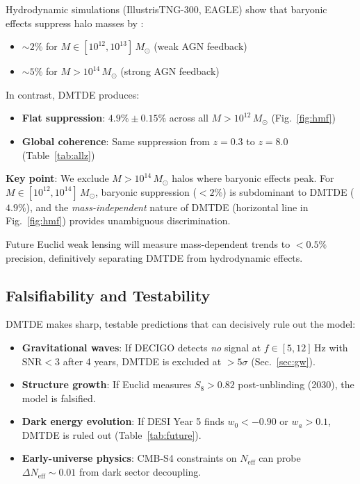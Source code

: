 \documentclass[aps,prd,twocolumn,superscriptaddress,nofootinbib,floatfix,preprintnumbers]{revtex4-2}
\newcommand{\DMTDE}{\textsc{DMTDE}\xspace}
\newcommand{\Msun}{\ensuremath{M_\odot}\xspace}
\begin{document}
Hydrodynamic simulations (IllustrisTNG-300, EAGLE) show that baryonic effects suppress halo masses by \citep{springel2018,pillepich2018}:
\begin{itemize}
    \item $\sim 2\%$ for $M \in [10^{12}, 10^{13}]\,\Msun$ (weak AGN feedback)
    \item $\sim 5\%$ for $M > 10^{14}\,\Msun$ (strong AGN feedback)
\end{itemize}

In contrast, DMTDE produces:
\begin{itemize}
    \item \textbf{Flat suppression}: $4.9\% \pm 0.15\%$ across all $M > 10^{12}\,\Msun$ (Fig.~\ref{fig:hmf})
    \item \textbf{Global coherence}: Same suppression from $z = 0.3$ to $z = 8.0$ (Table~\ref{tab:allz})
\end{itemize}

\textbf{Key point}: We exclude $M > 10^{14}\,\Msun$ halos where baryonic effects peak. For $M \in [10^{12}, 10^{14}]\,\Msun$, baryonic suppression ($<2\%$) is subdominant to DMTDE ($4.9\%$), and the \textit{mass-independent} nature of DMTDE (horizontal line in Fig.~\ref{fig:hmf}) provides unambiguous discrimination.

Future Euclid weak lensing will measure mass-dependent trends to $<0.5\%$ precision, definitively separating DMTDE from hydrodynamic effects.

\subsection{Falsifiability and Testability}
\label{subsec:falsifiability}

\DMTDE makes sharp, testable predictions that can decisively rule out the model:

\begin{itemize}
    \item \textbf{Gravitational waves}: If DECIGO detects \textit{no} signal at $f \in [5, 12]\,\mathrm{Hz}$ with $\mathrm{SNR} < 3$ after 4 years, \DMTDE is excluded at $>5\sigma$ (Sec.~\ref{sec:gw}).
    \item \textbf{Structure growth}: If Euclid measures $S_8 > 0.82$ post-unblinding (2030), the model is falsified.
    \item \textbf{Dark energy evolution}: If DESI Year 5 finds $w_0 < -0.90$ or $w_a > 0.1$, \DMTDE is ruled out (Table~\ref{tab:future}).
    \item \textbf{Early-universe physics}: CMB-S4 constraints on $N_\mathrm{eff}$ can probe $\Delta N_\mathrm{eff} \sim 0.01$ from dark sector decoupling.
\end{itemize}
\end{document}
